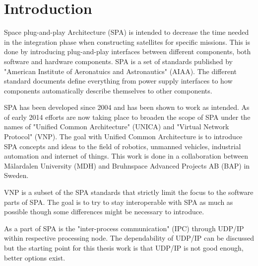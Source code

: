 \chapter{Introduction}
Space plug-and-play Architecture (SPA) is intended to decrease the time needed
in the integration phase when constructing satellites for specific missions.
This is done by introducing plug-and-play interfaces between different
components, both software and hardware components.  SPA is a
set of standards published by "American Institute of Aeronatuics and
Astronautics" (AIAA). The different standard documents define everything from
power supply interfaces to how components automatically describe themselves to
other components.


SPA has been developed since 2004 and has been shown to work as intended. As of
early 2014 efforts are now taking place to broaden the scope of SPA under the
names of "Unified Common Architecture" (UNICA) and "Virtual Network Protocol"
(VNP). The goal with Unified Common Architecture is to introduce SPA concepts
and ideas to the field of robotics, unmanned vehicles, industrial automation
and internet of things. This work is done in a collaboration between
M\"{a}lardalen University (MDH) and Bruhnspace Advanced Projects AB (BAP) in
Sweden.


VNP is a subset of the SPA standards that strictly limit the focus to the
software parts of SPA. The goal is to try to stay interoperable with SPA as
much as possible though some differences might be necessary to introduce.

As a part of SPA is the "inter-process communication" (IPC)
through UDP/IP within respective processing node. The dependability of
UDP/IP can be discussed but the starting point for this thesis work is that
UDP/IP is not good enough, better options exist.


